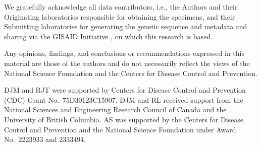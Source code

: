 \documentclass{article}
\begin{document}
We gratefully acknowledge all
data contributors, i.e., the Authors and their Originating laboratories
responsible for obtaining the specimens, and their Submitting laboratories for
generating the genetic sequence and metadata and sharing via the GISAID
Initiative \citep{elbe2017data}, on which this research is based.

Any opinions, findings, and
conclusions or recommendations expressed in this material are
those of the authors and do not necessarily reflect the views of
the National Science Foundation and the Centers for Disease
Control and Prevention.

DJM and RJT were supported by Centers for Disease Control and Prevention (CDC)
Grant No.\ 75D30123C15907. DJM and RL received support from the National
Sciences and Engineering Research Council of Canada and the University of
British Columbia. AS was supported by the Centers for Disease Control
and Prevention and the National Science Foundation under
Award No.\ 2223933 and 2333494. 

\clearpage
%
% 


\end{document}
